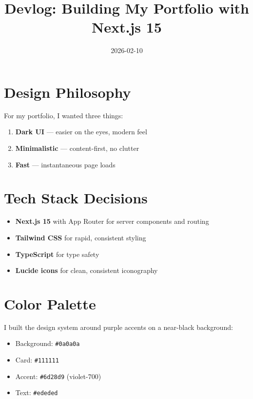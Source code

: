 \title{Devlog: Building My Portfolio with Next.js 15}
\date{2026-02-10}



\section{Design Philosophy}

For my portfolio, I wanted three things:

\begin{enumerate}
  \item \textbf{Dark UI} — easier on the eyes, modern feel
  \item \textbf{Minimalistic} — content-first, no clutter
  \item \textbf{Fast} — instantaneous page loads
\end{enumerate}

\section{Tech Stack Decisions}

\begin{itemize}
  \item \textbf{Next.js 15} with App Router for server components and routing
  \item \textbf{Tailwind CSS} for rapid, consistent styling
  \item \textbf{TypeScript} for type safety
  \item \textbf{Lucide icons} for clean, consistent iconography
\end{itemize}

\section{Color Palette}

I built the design system around purple accents on a near-black background:

\begin{itemize}
  \item Background: \texttt{\#0a0a0a}
  \item Card: \texttt{\#111111}
  \item Accent: \texttt{\#6d28d9} (violet-700)
  \item Text: \texttt{\#ededed}
\end{itemize}


